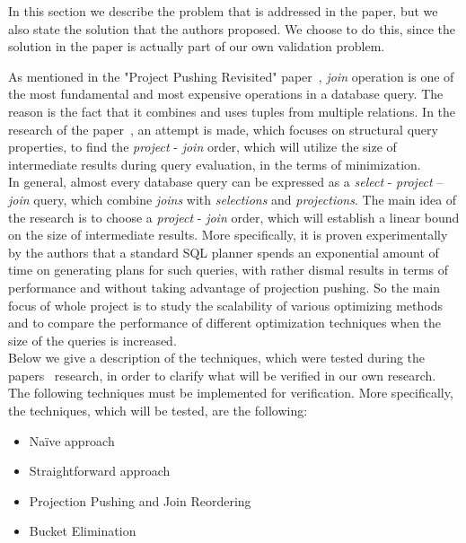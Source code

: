 In this section we describe the problem that is addressed in the paper, but we also state the solution that the authors proposed. We choose to do this, since the solution in the paper is actually part of our own validation problem.

As mentioned in the "Project Pushing Revisited" paper~\cite{paper}, \textit{join} operation is one of the most fundamental and most expensive operations in a database query. The reason is the fact that it combines and uses tuples from multiple relations. In the research of the paper~\cite{paper}, an attempt is made, which focuses on structural query properties, to find the \textit{project} - \textit{join} order, which will utilize the size of intermediate results during query evaluation, in the terms of minimization. \\

In general, almost every database query can be expressed as a \textit{select} - \textit{project} – \textit{join} query, which combine \textit{joins} with \textit{selections} and \textit{projections}. The main idea of the research is to choose a \textit{project} - \textit{join} order, which will establish a linear bound on the size of intermediate results. More specifically, it is proven experimentally by the authors that a standard SQL planner spends an exponential amount of time on generating plans for such queries, with rather dismal results in terms of performance and without taking advantage of projection pushing. So the main focus of whole project is to study the scalability of various optimizing methods and to compare the performance of different optimization techniques when the size of the queries is increased. \\

Below we give a description of the techniques, which were tested during the papers~\cite{paper} research, in order to clarify what will be verified in our own research. The following techniques must be implemented for verification. More specifically, the techniques, which will be tested, are the following:

\begin{itemize}
	\item Na\"ive approach
	\item Straightforward approach
	\item Projection Pushing and Join Reordering
	\item Bucket Elimination
\end{itemize}

